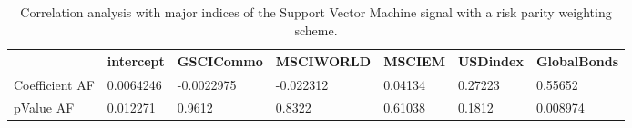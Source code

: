 \begin{table}[H]
\centering
\begin{tabular}{lllllll}
\hline& intercept & GSCICommo & MSCIWORLD & MSCIEM & USDindex & GlobalBonds \\ 
\hline 
Coefficient AF & 0.0064246 & -0.0022975 & -0.022312 & 0.04134 & 0.27223 & 0.55652 \\ 
pValue AF & 0.012271 & 0.9612 & 0.8322 & 0.61038 & 0.1812 & 0.008974 \\ 
\hline
\end{tabular}
\caption{Correlation analysis with major indices of the Support Vector Machine signal with a risk parity weighting scheme.}
\label{SVM_MODEL_Risk_AFACTOR}
\end{table}